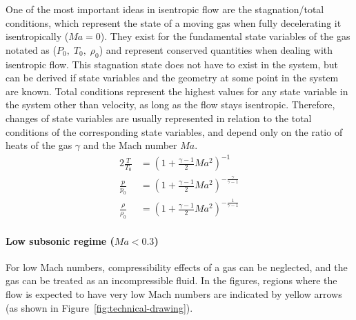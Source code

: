	One of the most important ideas in isentropic flow are the stagnation/total conditions, which represent the state of a moving gas when fully decelerating it isentropically ($Ma = 0$).
	They exist for the fundamental state variables of the gas notated as ($P_0,\;T_0,\;\rho_0$) and represent conserved quantities when dealing with isentropic flow.
	This stagnation state does not have to exist in the system, but can be derived if state variables and the geometry at some point in the system are known.
	Total conditions represent the highest values for any state variable in the system other than velocity, as long as the flow stays isentropic.
	Therefore, changes of state variables are usually represented in relation to the total conditions of the corresponding state variables, and depend only on the ratio of heats of the gas $\gamma$ and the Mach number $Ma$.
	\begin{alignat}{2}
	    \frac{T}{T_0}   & = \left( 1 + \frac{\gamma - 1}{2} Ma^2 \right)^{-1} \label{eq:total_relation_T}\\
	    \frac{p}{p_0}   & = \left( 1 + \frac{\gamma - 1}{2} Ma^2 \right)^{-\frac{\gamma}{\gamma - 1}} \label{eq:total_relation_p}\\
	    \frac{\rho}{\rho_0} & = \left( 1 + \frac{\gamma - 1}{2} Ma^2 \right)^{-\frac{1}{\gamma - 1}} \label{eq:total_relation_rho}
	\end{alignat}

	\paragraph{Low subsonic regime ($Ma < 0.3$)}
		For low Mach numbers, compressibility effects of a gas can be neglected, and the gas can be treated as an incompressible fluid.
		In the figures, regions where the flow is expected to have very low Mach numbers are indicated by yellow arrows (as shown in Figure~\ref{fig:technical-drawing}).

